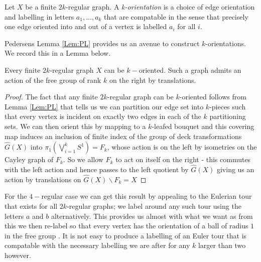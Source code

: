 \begin{definition}
Let $X$ be a finite $2k$-regular graph. A \textit{k-orientation} is a choice of edge orientation and labelling in letters $a_{1},...,a_{k}$ that are compatable in the sense that precisely one edge oriented into and out of a vertex is labelled $a_{i}$ for all $i$.
\end{definition}

Pedersens Lemma \ref{Lem:PL} provides us an avenue to construct $k$-orientations. We record this in a Lemma below.
\begin{lemma}\label{Lem:MT1}
Every finite $2k$-regular graph $X$ can be $k-$oriented. Such a graph admits an action of the free group of rank $k$ on the right by translations.
\end{lemma}
\begin{proof}
The fact that any finite $2k$-regular graph can be $k$-oriented follows from Lemma \ref{Lem:PL} that tells us we can partition our edge set into $k$-pieces such that every vertex is incident on exactly two edges in each of the $k$ partitioning sets. We can then orient this by mapping to a $k$-leafed bouquet and this covering map induces an inclusion of finite index of the group of deck transformations $\widehat{G}(X)$ into $\pi_{1}(\bigvee_{i=1}^{k}S^{1})=F_{k}$, whose action is on the left by isometries on the Cayley graph of $F_{k}$. So we allow $F_{k}$ to act on itself on the right - this commutes with the left action and hence passes to the left quotient by $\widehat{G}(X)$ giving us an action by translations on $\widehat{G}(X)\backslash F_{k}=X$
\end{proof}

\begin{remark}
For the $4-$regular case we can get this result by appealing to the Eulerian tour that exists for all $2k$-regular graphs; we label around any such tour using the letters $a$ and $b$ alternatively. This provides us almost with what we want as from this we then re-label so that every vertex has the orientation of a ball of radius $1$ in the free group \cite[pg 57]{MR1867354}. It is not easy to produce a labelling of an Euler tour that is compatable with the necessary labelling we are after for any $k$ larger than two however.
\end{remark}

\begin{comment}
\begin{figure}[h]
\texttt{[image: Diagrams/Diagram3.png]}
\caption{Arriving at an action from an Euler Tour}
\label{Fig:AT}
\end{figure}
\end{comment}

